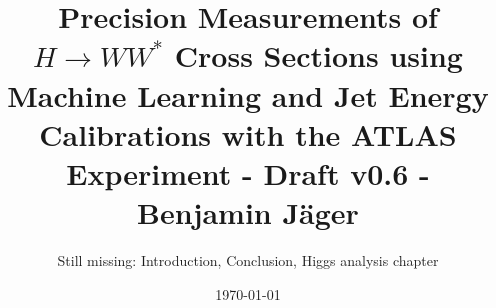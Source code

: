 

\endofdump


% 

\newif\ifIMAGES
\IMAGEStrue




\author{Still missing: Introduction, Conclusion, Higgs analysis chapter}
\date{\today}
\title{Precision Measurements of $H \to WW^*$ Cross Sections using Machine Learning and Jet Energy Calibrations with the ATLAS Experiment - Draft v0.6 - Benjamin Jäger}




\maketitle





\tableofcontents


\newcommand{\chapterdir}{chapters}
%

% 

% 

